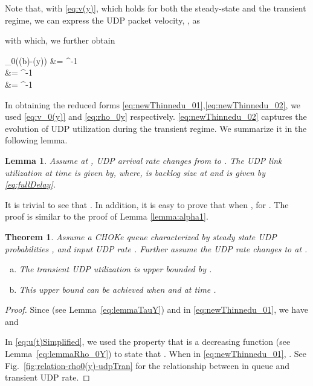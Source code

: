 \documentclass{IEEEtran}
\newtheorem{lemma}{Lemma}
\begin{document}
Note that, with \eqref{eq:v(y)}, which holds for both the steady-state and the transient regime, we can express the UDP packet velocity, ,  as
    
with which, we further obtain

\mu_0(\tau(b)-\tau(y)) &= ^{-1}  \nonumber \\
                                   &= ^{-1} \label{eq:newThinnedu_01}\\
                                   &= ^{-1}    \label{eq:newThinnedu_02}
    
    In obtaining the reduced forms \eqref{eq:newThinnedu_01},\eqref{eq:newThinnedu_02}, we used \eqref{eq:v_0(y)} and \eqref{eq:rho_0y} respectively. 
 \eqref{eq:newThinnedu_02} captures the evolution of UDP utilization during the transient regime. We summarize it in the following lemma.

 \begin{lemma}\label{eq:udpTranUtil}
 Assume at , UDP arrival rate changes from  to . The UDP link utilization at time   is given by, 
     where,  is backlog size at  and  is given by \eqref{eq:fullDelay}.
 \end{lemma}

    It is trivial to see that . In addition, it is easy to prove that when ,  for . The proof is similar to the proof of Lemma \ref{lemma:alpha1}.

    \newtheorem{theorem}{Theorem}
    \begin{theorem}\label{eq:Thorem_maxu(t)_0}
       Assume a CHOKe queue characterized by steady state UDP probabilities ,  and input UDP rate . Further assume the UDP rate changes to  at .
        \begin{enumerate}[(a)]
          \item The transient UDP utilization is upper bounded by .
          \item This upper bound can be achieved when  and at time .
        \end{enumerate}
    \end{theorem}

    \begin{proof}
      Since  (see Lemma~\ref{eq:lemmaTauY}) and  in \eqref{eq:newThinnedu_01}, we have  and
      

      In \eqref{eq:u(t)Simplified}, we used the property that  is a decreasing function (see Lemma~\ref{eq:lemmaRho_0Y}) to state that .
      When  in \eqref{eq:newThinnedu_01}, . See Fig.~\ref{fig:relation-rho0(y)-udpTran} for the relationship between  in queue and transient UDP rate.
    \end{proof}
\end{document}
